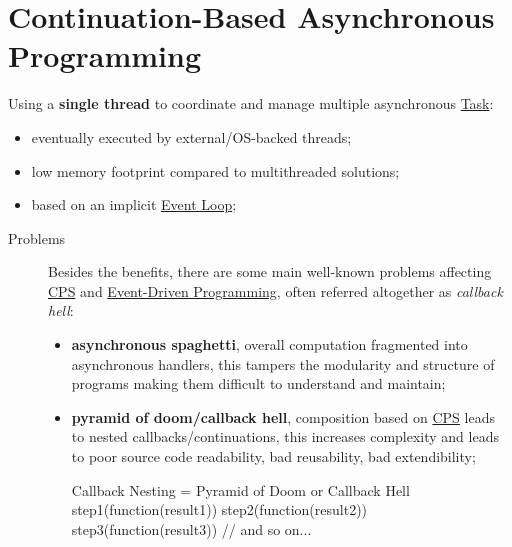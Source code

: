 \section{Continuation-Based Asynchronous Programming}\label{sec:rs_continuation_based_asynchronous_programming} %
Using a \textbf{single thread} to coordinate and manage multiple asynchronous \hyperref[def:task]{Task}:
\begin{itemize}
    \item eventually executed by external/OS-backed threads;
    \item low memory footprint compared to multithreaded solutions;
    \item based on an implicit \hyperref[sec:rs_event_loop]{Event Loop};
\end{itemize}
\begin{note}
\end{note}
\begin{description}
    \item[Problems] Besides the benefits, there are some main well-known problems affecting \hyperref[def:cps]{CPS} and \hyperref[sec:rs_event_driven_programming]{Event-Driven Programming}, often referred altogether as \textit{callback hell}:
        \begin{itemize}
            \item \textbf{asynchronous spaghetti}, overall computation fragmented into asynchronous handlers, this tampers the modularity and structure of programs making them difficult to understand and maintain;
            \item \textbf{pyramid of doom/callback hell}, composition based on \hyperref[def:cps]{CPS} leads to nested callbacks/continuations, this increases complexity and leads to poor source code readability, bad reusability, bad extendibility;
                \begin{codeblock}[js]{Callback Nesting = Pyramid of Doom or Callback Hell}
    step1(function(result1)) {
        step2(function(result2)) {
            step3(function(result3)){
                // and so on...
            }
        }
    }
                \end{codeblock}
        \end{itemize}
\end{description}
%
